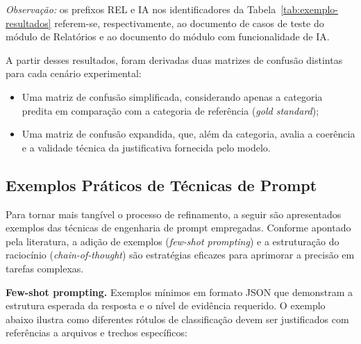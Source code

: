 \noindent\textit{Observação:} os prefixos REL e IA nos identificadores da Tabela~\ref{tab:exemplo-resultados} referem-se, respectivamente, ao documento de casos de teste do módulo de Relatórios e ao documento do módulo com funcionalidade de IA.

A partir desses resultados, foram derivadas duas matrizes de confusão distintas para cada cenário experimental: 
\begin{itemize}
    \item Uma matriz de confusão simplificada, considerando apenas a categoria predita em comparação com a categoria de referência (\textit{gold standard}); 
    \item Uma matriz de confusão expandida, que, além da categoria, avalia a coerência e a validade técnica da justificativa fornecida pelo modelo. 
\end{itemize}

\subsection{Exemplos Práticos de Técnicas de Prompt}

Para tornar mais tangível o processo de refinamento, a seguir são apresentados exemplos das técnicas de engenharia de prompt empregadas. Conforme apontado pela literatura, a adição de exemplos (\textit{few-shot prompting}) e a estruturação do raciocínio (\textit{chain-of-thought}) são estratégias eficazes para aprimorar a precisão em tarefas complexas.

\textbf{Few-shot prompting.}
Exemplos mínimos em formato JSON que demonstram a estrutura esperada da resposta e o nível de evidência requerido. O exemplo abaixo ilustra como diferentes rótulos de classificação devem ser justificados com referências a arquivos e trechos específicos:


